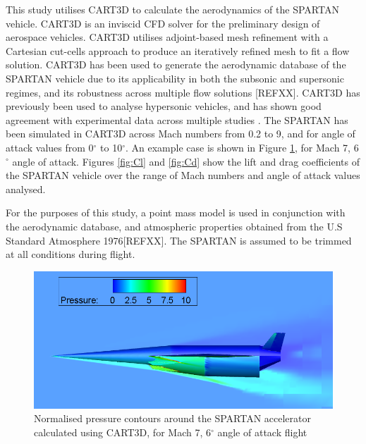 \documentclass[journal]{new-aiaa} %
\begin{document}
 This study utilises CART3D to calculate the aerodynamics of the SPARTAN vehicle\cite{CART3D}. CART3D is an inviscid CFD solver for the preliminary design of aerospace vehicles. CART3D utilises adjoint-based mesh refinement with a Cartesian cut-cells approach to produce an iteratively refined mesh to fit a flow solution\cite{Aftosmis1997}. CART3D has been used to generate the aerodynamic database of the SPARTAN vehicle due to its applicability in both the subsonic and supersonic regimes, and its robustness across multiple flow solutions [REFXX]. CART3D has previously been used to analyse hypersonic vehicles, and has shown good agreement with experimental data across multiple studies \cite{Sagerman2017,Aftosmis2011}. The SPARTAN has been simulated in CART3D across Mach numbers from 0.2 to 9, and for angle of attack values from 0$^\circ$ to 10$^\circ$. An example case is shown in Figure \ref{fig:M7AoA6}, for Mach 7, 6$^\circ$ angle of attack. Figures \ref{fig:Cl} and \ref{fig:Cd} show the lift and drag coefficients of the SPARTAN vehicle over the range of Mach numbers and angle of attack values analysed. 
 
 For the purposes of this study, a point mass model is used in conjunction with the aerodynamic database, and atmospheric properties obtained from the U.S Standard Atmosphere 1976[REFXX]. The SPARTAN is assumed to be trimmed at all conditions during flight.
 
 \begin{figure}
 	\centering
 	\includegraphics[width=0.7\linewidth]{Figures/M7AoA6}
 	\caption{Normalised pressure contours around the SPARTAN accelerator calculated using CART3D, for Mach 7, 6$^\circ$ angle of attack flight}
 	\label{fig:M7AoA6}
 \end{figure}
\end{document}
